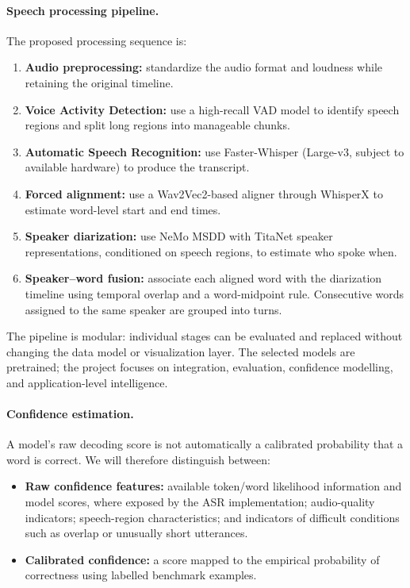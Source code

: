 \documentclass[11pt,a4paper]{article}
\begin{document}
\paragraph{Speech processing pipeline.}
The proposed processing sequence is:
\begin{enumerate}
  \item \textbf{Audio preprocessing:} standardize the audio format and
  loudness while retaining the original timeline.
  \item \textbf{Voice Activity Detection:} use a high-recall VAD model to
  identify speech regions and split long regions into manageable chunks.
  \item \textbf{Automatic Speech Recognition:} use Faster-Whisper
  (Large-v3, subject to available hardware) to produce the transcript.
  \item \textbf{Forced alignment:} use a Wav2Vec2-based aligner through
  WhisperX to estimate word-level start and end times.
  \item \textbf{Speaker diarization:} use NeMo MSDD with TitaNet speaker
  representations, conditioned on speech regions, to estimate who spoke
  when.
  \item \textbf{Speaker--word fusion:} associate each aligned word with the
  diarization timeline using temporal overlap and a word-midpoint rule.
  Consecutive words assigned to the same speaker are grouped into turns.
\end{enumerate}

The pipeline is modular: individual stages can be evaluated and replaced
without changing the data model or visualization layer. The selected models
are pretrained; the project focuses on integration, evaluation, confidence
modelling, and application-level intelligence.

\paragraph{Confidence estimation.}
A model's raw decoding score is not automatically a calibrated probability
that a word is correct. We will therefore distinguish between:
\begin{itemize}
  \item \textbf{Raw confidence features:} available token/word likelihood
  information and model scores, where exposed by the ASR implementation;
  audio-quality indicators; speech-region characteristics; and indicators
  of difficult conditions such as overlap or unusually short utterances.
  \item \textbf{Calibrated confidence:} a score mapped to the empirical
  probability of correctness using labelled benchmark examples.
\end{itemize}
\end{document}
